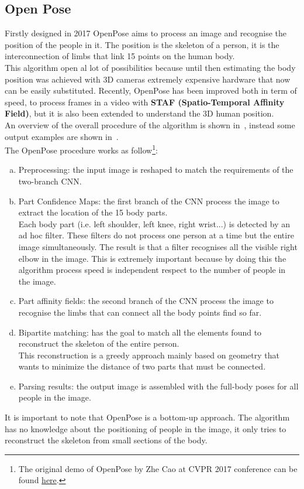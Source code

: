 \subsection{Open Pose} \label{sec:openpose}
Firstly designed in 2017 OpenPose\cite{openpose-PAF} aims to process an image and recognise the position of the people in it. The position is the skeleton of a person, it is the interconnection of limbs that link 15 points on the human body.\\
This algorithm open al lot of possibilities because until then estimating the body position was achieved with 3D cameras extremely expensive hardware that now can be easily substituted. Recently, OpenPose has been improved both in term of speed, to process frames in a video with \textbf{STAF (Spatio-Temporal Affinity Field)}\cite{openpose-STAF}, but it is also been extended to understand the 3D human position.\\
An overview of the overall procedure of the algorithm is shown in~, instead some output examples are shown in~.\\
The OpenPose procedure works as follow\footnote{The original demo of OpenPose by Zhe Cao at CVPR 2017 conference can be found \href{https://www.youtube.com/watch?v=pW6nZXeWlGM}{here}.}:
\begin{enumerate}[a)]
	\item Preprocessing: the input image is reshaped to match the requirements of the two-branch CNN.
	\item Part Confidence Maps: the first branch of the CNN process the image to extract the location of the 15 body parts.\\
	Each body part (i.e. left shoulder, left knee, right wrist...) is detected by an ad hoc filter. These filters do not process one person at a time but the entire image simultaneously. The result is that a filter recognises all the visible right elbow in the image. This is extremely important because by doing this the algorithm process speed is independent respect to the number of people in the image.
	\item Part affinity fields: the second branch of the CNN process the image to recognise the limbs that can connect all the body points find so far.
	\item Bipartite matching: has the goal to match all the elements found to reconstruct the skeleton of the entire person.\\
	This reconstruction is a greedy approach mainly based on geometry that wants to minimize the distance of two parts that must be connected.
	\item Parsing results: the output image is assembled with the full-body poses for all people in the image.
\end{enumerate}
It is important to note that OpenPose is a bottom-up approach. The algorithm has no knowledge about the positioning of people in the image, it only tries to reconstruct the skeleton from small sections of the body.

